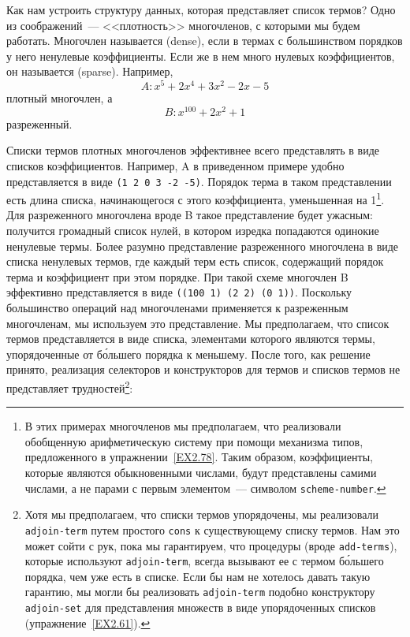 Как нам устроить структуру данных, которая представляет
список термов?  Одно из соображений~--- <<плотность>> многочленов, с
которыми мы будем работать.  Многочлен называется 
 (dense), если в
термах с большинством порядков у него ненулевые коэффициенты.  Если же
в нем много нулевых коэффициентов, он называется
 (sparse). Например, 
$$
A: x^5 + 2x^4 + 3x^2 - 2x - 5
$$
плотный многочлен, а
$$
B: x^{100} + 2x^2 + 1
$$
разреженный.

Списки термов плотных многочленов эффективнее всего
представлять в виде списков коэффициентов.  Например, A в приведенном
примере удобно представляется в виде {\tt (1 2 0 3 -2 -5)}.
Порядок терма в таком представлении есть длина списка, начинающегося с
этого коэффициента, уменьшенная на 1\footnote{В этих примерах многочленов мы предполагаем, что
реализовали обобщенную арифметическую систему при помощи механизма
типов, предложенного в упражнении~\ref{EX2.78}. Таким
образом, коэффициенты, которые являются обыкновенными числами, будут
представлены самими числами, а не парами с первым элементом~---  символом
{\tt scheme-number}.}.
Для разреженного многочлена вроде B такое представление будет ужасным:
получится громадный список нулей, в котором изредка попадаются
одинокие ненулевые термы.  Более разумно представление разреженного
многочлена в виде списка ненулевых термов, где каждый терм есть
список, содержащий порядок терма и коэффициент при этом порядке.  При
такой схеме многочлен B эффективно представляется в виде 
{\tt ((100 1) (2 2) (0 1))}.  Поскольку большинство операций
над многочленами применяется к разреженным многочленам, мы используем
это представление.  Мы предполагаем, что список термов представляется
в виде списка, элементами которого являются термы, упорядоченные от
б\'ольшего порядка к меньшему.  После того, как решение
принято, реализация селекторов и конструкторов для термов и списков
термов не представляет трудностей\footnote{Хотя мы предполагаем, что списки термов упорядочены,
мы реализовали {\tt adjoin-term} путем простого
{\tt cons} к существующему списку термов.  Нам это может сойти с
рук, пока мы гарантируем, что процедуры (вроде
{\tt add-terms}), которые используют {\tt adjoin-term},
всегда вызывают ее с термом б\'ольшего порядка, чем уже есть
в списке.  Если бы нам не хотелось давать такую гарантию, мы могли бы
реализовать {\tt adjoin-term} подобно конструктору
{\tt adjoin-set} для представления множеств в виде
упорядоченных списков (упражнение~\ref{EX2.61}).}:


